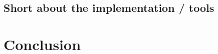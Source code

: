 \documentclass[a4paper,10pt]{article}
\begin{document}
\subsection{Short about the implementation / tools}

\newpage
\section{Conclusion}
\end{document}
